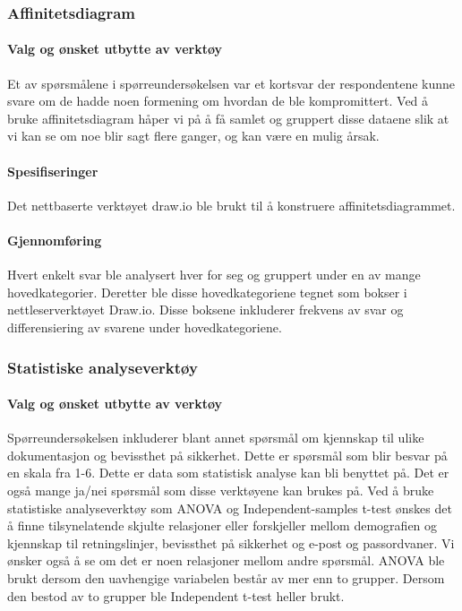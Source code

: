 \subsubsection{Affinitetsdiagram}

\paragraph{Valg og ønsket utbytte av verktøy}
Et av spørsmålene i spørreundersøkelsen var et kortsvar der respondentene kunne svare om de hadde noen formening om hvordan de ble kompromittert. Ved å bruke affinitetsdiagram håper vi på å få samlet og gruppert disse dataene slik at vi kan se om noe blir sagt flere ganger, og kan være en mulig årsak. 

\paragraph{Spesifiseringer}
Det nettbaserte verktøyet draw.io ble brukt til å konstruere affinitetsdiagrammet. 

\paragraph{Gjennomføring}
Hvert enkelt svar ble analysert hver for seg og gruppert under en av mange hovedkategorier. Deretter ble disse hovedkategoriene tegnet som bokser i nettleserverktøyet Draw.io. Disse boksene inkluderer frekvens av svar og differensiering av svarene under hovedkategoriene. 


\subsubsection{Statistiske analyseverktøy}

\paragraph{Valg og ønsket utbytte av verktøy}
Spørreundersøkelsen inkluderer blant annet spørsmål om kjennskap til ulike dokumentasjon og bevissthet på sikkerhet. Dette er spørsmål som blir besvar på en skala fra 1-6. Dette er data som statistisk analyse kan bli benyttet på. Det er også mange ja/nei spørsmål som disse verktøyene kan brukes på. Ved å bruke statistiske analyseverktøy som ANOVA og Independent-samples t-test ønskes det å finne tilsynelatende skjulte relasjoner eller forskjeller mellom demografien og kjennskap til retningslinjer, bevissthet på sikkerhet og e-post og passordvaner. Vi ønsker også å se om det er noen relasjoner mellom andre spørsmål. ANOVA ble brukt dersom den uavhengige variabelen består av mer enn to grupper. Dersom den bestod av to grupper ble Independent t-test heller brukt.

